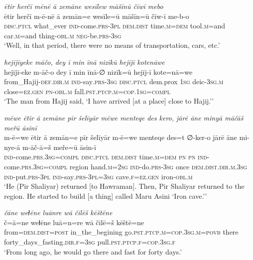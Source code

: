 \ea \label{ŽP.98}
\textit{ētir herčī mēnē ā zemāne wesīlew māšīnū čīwī mebo} \\ 
\gll ētir herčī m-ē-nē ā zemān=e wesīle=ū māšīn=ū čīw-ī me-b-o \\ 
 \textsc{disc.ptcl} what\_ever \textsc{ind-}come\textsc{.prs}\textsc{-3pl} \textsc{dem.dist} time\textsc{.m}\textsc{=dem} tool\textsc{.m}=and car\textsc{.m}=and thing\textsc{-obl}\textsc{.m} \textsc{neg-}be\textsc{.prs}\textsc{-3sg} \\ 
\glt `Well, in that period, there were no means of transportation, cars, etc.'
\z 
 
\ea \label{ŽP.102}
\textit{hejījīyeke māčo, dey ī min īnā nizīkū hejījī kotenāwe} \\ 
\gll hejījī-eke m-āč-o dey ī min īnā-∅ nizīk=ū hejīj-ī kote=nā=we \\ 
 from\_Hajij\textsc{-def}\textsc{.dir}\textsc{.m} \textsc{ind-}say\textsc{.prs}\textsc{-3sg} \textsc{disc.ptcl} dem.prox \textsc{1sg} deic\textsc{-3sg}\textsc{.m} close\textsc{\textsc{=ez.gen}} \textsc{pn}\textsc{-obl}\textsc{.m} fall\textsc{.pst}\textsc{.ptcp}\textsc{.m}\textsc{=cop}\textsc{.\textsc{1sg}}\textsc{=compl} \\ 
\glt `The man from Hajij said, ‘I have arrived [at a place] close to Hajij.’'
\z 
 
\ea \label{ŽP.116}
\textit{mēwe ētir ā zemāne pīr šelīyār mēwe menteqe des kero, jārē āne minyā māčāš meřū āsinī} \\ 
\gll m-ē=we ētir ā zemān=e pīr šelīyār m-ē=we menteqe des=t ∅-ker-o jārē āne mi-nye-ā m-āč-ā=š meře=ū āsin-ī \\ 
 \textsc{ind-}come\textsc{.prs}\textsc{.3sg}\textsc{=compl} \textsc{disc.ptcl} \textsc{dem.dist} time\textsc{.m}\textsc{=dem} \textsc{pn} \textsc{pn} \textsc{ind-}come\textsc{.prs}\textsc{.3sg}\textsc{=compl} region hand\textsc{.m}\textsc{=\textsc{2sg}} \textsc{ind-}do\textsc{.prs}\textsc{-3sg} once \textsc{dem.dist}\textsc{.dir}\textsc{.m}\textsc{.3sg} \textsc{ind-}put\textsc{.prs}\textsc{-3pl} \textsc{ind-}say\textsc{.prs}\textsc{-3pl}\textsc{=3sg} cave\textsc{.f}\textsc{\textsc{=ez.gen}} iron\textsc{-obl}\textsc{.m} \\ 
\glt `He (Pir Shaliyar) returned [to Hawraman]. Then, Pir Shaliyar returned to the region. He started to build [a thing] called Maru Asini ‘Iron cave.’'
\z 
 
\ea \label{ŽP.119}
\textit{čāne weɫēne luānre wā čilēš kēštēne} \\ 
\gll č=ā=ne weɫēne luā=n=re wā čilē=š kēštē=ne \\ 
 from=\textsc{dem.dist}\textsc{=\textsc{post}} in\_the\_begining go\textsc{.pst}\textsc{.ptcp}\textsc{.m}\textsc{=cop}\textsc{.3sg}\textsc{.m}\textsc{=\textsc{povb}} there forty\_days\_fasting\textsc{.dir}\textsc{.f}\textsc{=3sg} pull\textsc{.pst}\textsc{.ptcp}\textsc{.f}\textsc{=cop}\textsc{.3sg}\textsc{.f} \\ 
\glt `From long ago, he would go there and fast for forty days.'
\z 
 
